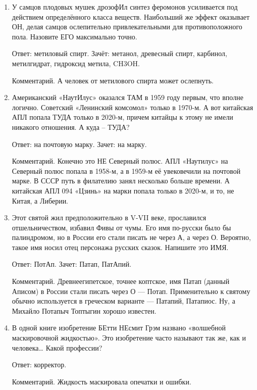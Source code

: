 \documentclass[oneside,final,14pt]{extreport}
\begin{document}
\begin{enumerate}
    Ответ: «Матрица». Зачёт: по упоминанию «Матрицы».

    Комментарий. Видим код – говорим «Матрица».

    \item У самцов плодовых мушек дрозофИл синтез феромонов усиливается под действием определённого класса веществ. Наибольший же эффект оказывает ОН, делая самцов ослепительно привлекательными для противоположного пола. Назовите ЕГО максимально точно.

    Ответ: метиловый спирт. Зачёт: метанол, древесный спирт, карбинол, метилгидрат, гидроксид метила, CH3OH.

    Комментарий. А человек от метилового спирта может ослепнуть.

    \item Американский «НаутИлус» оказался ТАМ в 1959 году первым, что вполне логично. Советский «Ленинский комсомол» только в 1970-м. А вот китайская АПЛ попала ТУДА только в 2020-м, причем китайцы к этому не имели никакого отношения. А куда – ТУДА?

    Ответ: на почтовую марку. Зачет: на марку.

    Комментарий. Конечно это НЕ Северный полюс. АПЛ «Наутилус» на Северный полюс попала в 1958-м, а в 1959-м её увековечили на почтовой марке. В СССР путь в филателию занял несколько больше времени. А китайская АПЛ 094 «Цзинь» на марки попала только в 2020-м, и то, не Китая, а Либерии.


    \item Этот святой жил предположительно в V-VII веке, прославился отшельничеством, избавил Фивы от чумы. Его имя по-русски было бы палиндромом, но в России его стали писать не через А, а через О. Вероятно, такое имя носил отец персонажа русских сказок. Напишите это ИМЯ.

    Ответ: ПотАп. Зачет: Патап, ПатАпий.

    Комментарий. Древнеегипетское, точнее коптское, имя Патап (данный Аписом) в России стали писать через О — Потап. Применительно к святому обычно используется в греческом варианте — Патапий, Патапиос. Ну, а Михайло Потапыч Топтыгин хорошо известен.

    \item В одной книге изобретение БЕтти НЕсмит Грэм названо «волшебной маскировочной жидкостью». Это изобретение часто называют так же, как и человека… Какой профессии?

    Ответ: корректор.

    Комментарий. Жидкость маскировала опечатки и ошибки.


\end{enumerate}
\end{document}
